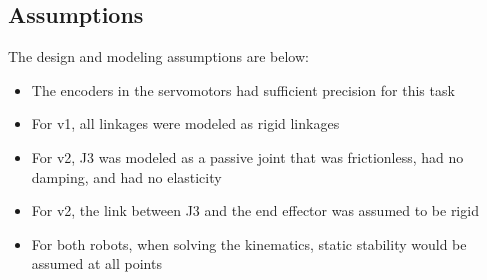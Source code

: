 \subsection{Assumptions}
The design and modeling assumptions are below:
\begin{itemize}
\item The encoders in the servomotors had sufficient precision for this task
\item For v1, all linkages were modeled as rigid linkages 
\item For v2, J3 was modeled as a passive joint that was frictionless, had no damping, and had no elasticity
\item For v2, the link between J3 and the end effector was assumed to be rigid
\item For both robots, when solving the kinematics, static stability would be assumed at all points
\end{itemize}